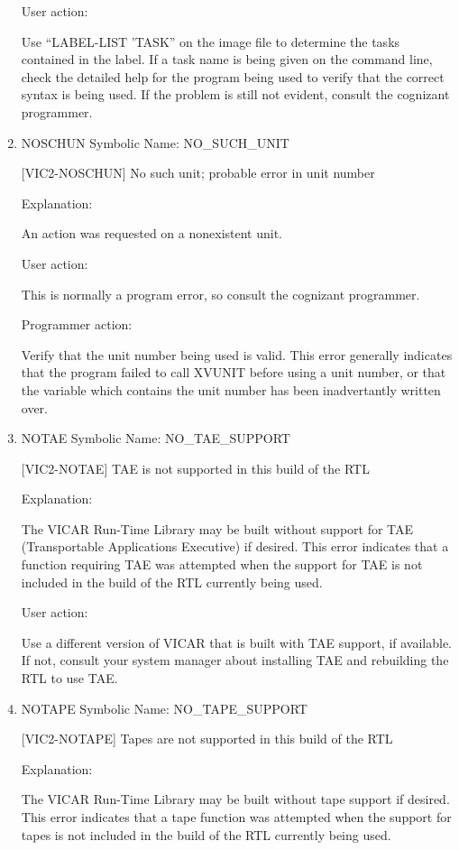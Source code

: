 \begin{enumerate}
User action:

Use ``LABEL-LIST 'TASK'' on the image file to determine the tasks
contained in the label.  If a task name is being given on the
command line, check the detailed help for the program being used to
verify that the correct syntax is being used.  If the problem is
still not evident, consult the cognizant programmer.


\item NOSCHUN Symbolic Name: NO\_SUCH\_UNIT

[VIC2-NOSCHUN] No such unit; probable error in unit number

Explanation:

An action was requested on a nonexistent unit.

User action:

This is normally a program error, so consult the cognizant programmer.

Programmer action:

Verify that the unit number being used is valid.  This error
generally indicates that the program failed to call XVUNIT before
using a unit number, or that the variable which contains the unit
number has been inadvertantly written over.


\item NOTAE Symbolic Name: NO\_TAE\_SUPPORT

[VIC2-NOTAE] TAE is not supported in this build of the RTL

Explanation:

The VICAR Run-Time Library may be built without support for
TAE (Transportable Applications Executive) if desired.  This
error indicates that a function requiring TAE was attempted
when the support for TAE is not included in the build of the
RTL currently being used.

User action:

Use a different version of VICAR that is built with TAE support,
if available.  If not, consult your system manager about installing
TAE and rebuilding the RTL to use TAE.


\item NOTAPE Symbolic Name: NO\_TAPE\_SUPPORT

[VIC2-NOTAPE] Tapes are not supported in this build of the RTL

Explanation:

The VICAR Run-Time Library may be built without tape support
if desired.  This error indicates that a tape function was
attempted when the support for tapes is not included in the
build of the RTL currently being used.


\end{enumerate}
